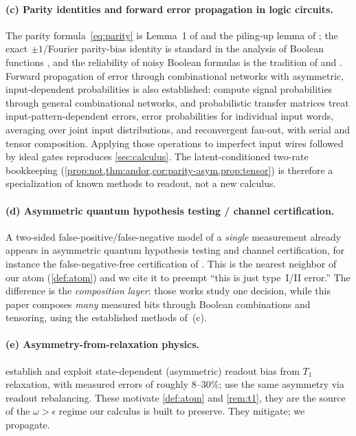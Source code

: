 \documentclass[11pt]{article}
\numberwithin{equation}{section}
\theoremstyle{plain}
\theoremstyle{definition}
\theoremstyle{remark}
\newcommand{\eps}{\epsilon}
\begin{document}
\paragraph{(c) Parity identities and forward error propagation in logic
circuits.} The parity formula~\eqref{eq:parity} is Lemma~1 of
\citet{gallager1962ldpc} and the piling-up lemma of \citet{matsui1993linear};
the exact $\pm1$/Fourier parity-bias identity is standard in the analysis of
Boolean functions \citep{odonnell2014}, and the reliability of noisy Boolean
formulas is the tradition of \citet{vonneumann1956} and \citet{pippenger1988}.
Forward propagation of error through combinational networks with asymmetric,
input-dependent probabilities is also established: \citet{parker1975probabilistic}
compute signal probabilities through general combinational networks, and
probabilistic transfer matrices \citep{krishnaswamy2008ptm} treat
input-pattern-dependent errors, error probabilities for individual input words,
averaging over joint input distributions, and reconvergent fan-out, with serial
and tensor composition. Applying those operations to imperfect input wires
followed by ideal gates reproduces \cref{sec:calculus}. The latent-conditioned
two-rate bookkeeping (\cref{prop:not,thm:andor,cor:parity-asym,prop:tensor}) is
therefore a specialization of known methods to readout, not a new calculus.

\paragraph{(d) Asymmetric quantum hypothesis testing / channel certification.}
A two-sided false-positive/false-negative model of a \emph{single} measurement
already appears in asymmetric quantum hypothesis testing and channel
certification, for instance the false-negative-free certification of
\citet{krawiec2021certification}. This is the nearest neighbor of our atom
(\cref{def:atom}) and we cite it to preempt ``this is just type~I/II error.'' The
difference is the \emph{composition layer}: those works study one decision,
while this paper composes \emph{many} measured bits through Boolean
combinations and tensoring, using the established methods of~(c).

\paragraph{(e) Asymmetry-from-relaxation physics.}
\citet{tannu2019mitigating} establish and exploit state-dependent (asymmetric)
readout bias from $T_1$ relaxation, with measured errors of roughly $8$--$30\%$;
\citet{hicks2021readout} use the same asymmetry via readout rebalancing. These
motivate \cref{def:atom} and \cref{rem:t1}, they are the source of the $\omega>\eps$
regime our calculus is built to preserve. They mitigate; we propagate.
\end{document}
